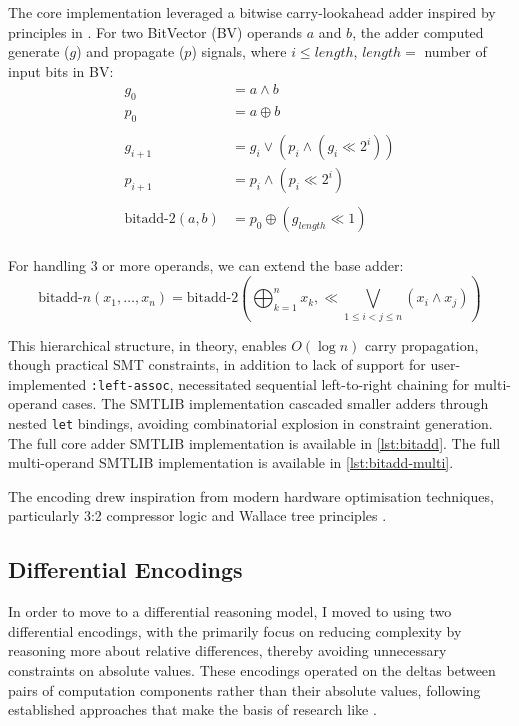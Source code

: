 \documentclass[a4paper]{report}
\begin{document}
The core implementation leveraged a bitwise carry-lookahead adder inspired by principles in \cite{wiki:cla} \cite{kogge_1973}.
For two BitVector (BV) operands $a$ and $b$, the adder computed generate ($g$) and propagate ($p$) signals, where $i \leq length$, $length =$ number of input bits in BV:
\begin{equation}
	\begin{aligned}
		g_0 &= a \land b \\
		p_0 &= a \oplus b \\
		\\
		g_{i + 1} &= g_i \lor (p_i \land (g_i \ll 2^i)) \\
		p_{i + 1} &= p_i \land (p_i \ll 2^i) \\
		\\
		\text{bitadd-2}(a, b) &= p_0 \oplus (g_{length} \ll 1) \\
	\end{aligned}
\end{equation}

For handling 3 or more operands, we can extend the base adder:
\begin{equation}
    \text{bitadd-$n$}(x_1, \ldots, x_n) = \text{bitadd-2}(\bigoplus_{k=1}^n x_k, \ll \bigvee_{1 \leq i < j \leq n} (x_i \land x_j))
\end{equation}

This hierarchical structure, in theory, enables $O(\log n)$ carry propagation, though practical SMT constraints,
in addition to lack of support for user-implemented \verb|:left-assoc|, necessitated sequential left-to-right chaining for multi-operand cases.
The SMTLIB implementation cascaded smaller adders through nested \texttt{let} bindings, avoiding combinatorial explosion in constraint generation.
The full core adder SMTLIB implementation is available in \ref{lst:bitadd}.
The full multi-operand SMTLIB implementation is available in \ref{lst:bitadd-multi}.

The encoding drew inspiration from modern hardware optimisation techniques, particularly 3:2 compressor logic \cite{wiki:3:2_compressor} and Wallace tree principles \cite{wallace_1964}.

\subsection{Differential Encodings}
\label{ssec:differential-encoding}
In order to move to a differential reasoning model, I moved to using two differential encodings,
with the primarily focus on reducing complexity by reasoning more about relative differences, thereby avoiding unnecessary constraints on absolute values.
These encodings operated on the deltas between pairs of computation components rather than their absolute values,
following established approaches that make the basis of research like \cite{li_2024}.
\end{document}
